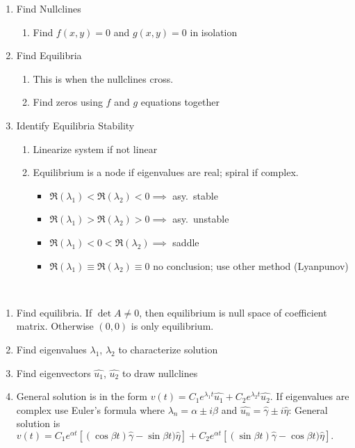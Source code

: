   \begin{enumerate}
  \item Find Nullclines
    \begin{enumerate}
    \item Find $f(x,y)=0$ and $g(x,y)=0$ in isolation
    \end{enumerate}
  \item Find Equilibria
    \begin{enumerate}
    \item This is when the nullclines cross.
    \item Find zeros using $f$ and $g$ equations together
    \end{enumerate}
  \item Identify Equilibria Stability
    \begin{enumerate}
    \item Linearize system if not linear
    \item Equilibrium is a node if eigenvalues are real; spiral if complex.
      \begin{itemize}
      \item $\Re(\lambda_1) < \Re(\lambda_2) < 0 \implies$ asy.\ stable
      \item $\Re(\lambda_1) > \Re(\lambda_2) > 0 \implies$ asy.\ unstable
      \item $\Re(\lambda_1) < 0 < \Re(\lambda_2) \implies$ saddle
      \item $\Re(\lambda_1) \equiv \Re(\lambda_2) \equiv 0$ no conclusion; use
        other method (Lyanpunov)
      \end{itemize}
    \end{enumerate}
  \end{enumerate}
\item[Two-Dimensional Linear Systems] \hfill \\
  \begin{enumerate}
  \item Find equilibria. If $\det A\ne0$, then equilibrium is null space of
    coefficient matrix. Otherwise $(0,0)$ is only equilibrium.
  \item Find eigenvalues $\lambda_1$, $\lambda_2$ to characterize solution
  \item Find eigenvectors $\hat{u_1}$, $\hat{u_2}$ to draw nullclines
  \item General solution is in the form $v(t)=C_1e^{\lambda_1
      t}\hat{u_1}+C_2e^{\lambda_2 t}\hat{u_2}$. If eigenvalues are complex use
    Euler's formula where $\lambda_n=\alpha\pm i\beta$ and
    $\hat{u_n}=\hat{\gamma}\pm i\hat{\eta}$: General solution is $v(t) =
    C_1e^{\alpha t}[(\cos\beta t)\hat{\gamma} - \sin\beta t)\hat{\eta}] +
    C_2e^{\alpha t}[(\sin\beta t)\hat{\gamma} - \cos\beta t)\hat{\eta}].$
  \end{enumerate}